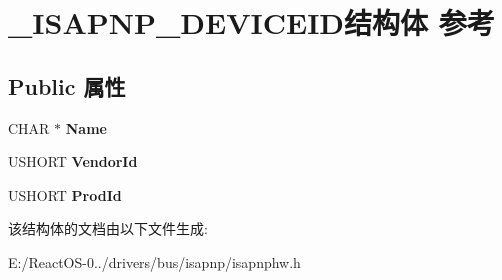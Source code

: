 \hypertarget{struct___i_s_a_p_n_p___d_e_v_i_c_e_i_d}{}\section{\+\_\+\+I\+S\+A\+P\+N\+P\+\_\+\+D\+E\+V\+I\+C\+E\+I\+D结构体 参考}
\label{struct___i_s_a_p_n_p___d_e_v_i_c_e_i_d}
\subsection*{Public 属性}
\begin{DoxyCompactItemize}
\item 
\mbox{\label{struct___i_s_a_p_n_p___d_e_v_i_c_e_i_d_a50145bc18b2193171fe24ef0121e6d10}} 
C\+H\+AR $\ast$ {\bfseries Name}
\item 
\mbox{\label{struct___i_s_a_p_n_p___d_e_v_i_c_e_i_d_a52c77796c292c7ec27a47d820c36622f}} 
U\+S\+H\+O\+RT {\bfseries Vendor\+Id}
\item 
\mbox{\label{struct___i_s_a_p_n_p___d_e_v_i_c_e_i_d_ab1bc6ec5238a7b4a51b7fc77eae55702}} 
U\+S\+H\+O\+RT {\bfseries Prod\+Id}
\end{DoxyCompactItemize}


该结构体的文档由以下文件生成\+:\begin{DoxyCompactItemize}
\item 
E\+:/\+React\+O\+S-\/0../drivers/bus/isapnp/isapnphw.\+h\end{DoxyCompactItemize}
